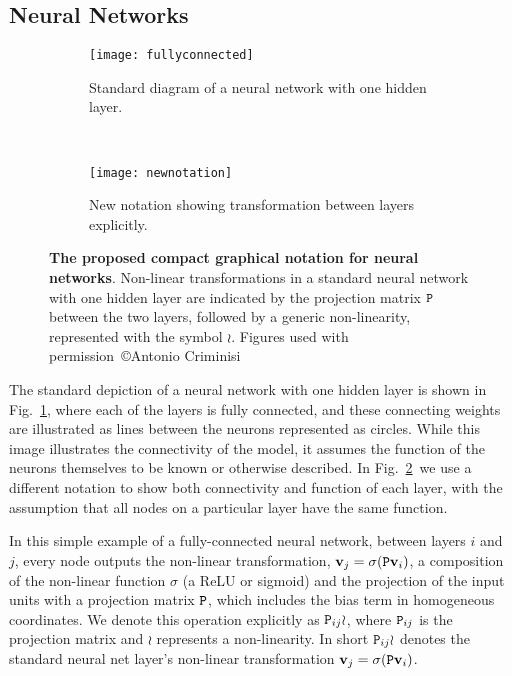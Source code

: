 \documentclass[thesis]{subfiles}
\begin{document}
\subsection{Neural Networks}
\begin{figure}[htbp!] 
\centering
\begin{subfigure}[b]{0.45\textwidth}
   \centering
   \texttt{[image: fullyconnected]}
   \caption{Standard diagram of a neural network with one hidden layer.}
   \label{fig:oldnotation}
\end{subfigure}
~
\begin{subfigure}[b]{0.45\textwidth}
   \centering
   \texttt{[image: newnotation]}
   \caption{New notation showing transformation between layers explicitly.}
   \label{fig:newnotation}
\end{subfigure}
\caption[New graphical notation for a standard neural network with one hidden layer.]{{\bf The proposed compact graphical notation for neural networks}. Non-linear transformations in a standard neural network with one hidden layer are indicated by the projection matrix $\mat P$ between the two layers, followed by a generic non-linearity, represented with the symbol $\wr$. Figures used with permission~\copyright Antonio Criminisi}
\label{fig:newGraphLanguage}
\end{figure}

The standard depiction of a neural network with one hidden layer is shown in Fig.~\ref{fig:oldnotation}, where each of the layers is fully connected, and these connecting weights are illustrated as lines between the neurons represented as circles. While this image illustrates the connectivity of the model, it assumes the function of the neurons themselves to be known or otherwise described. In Fig.~\ref{fig:newnotation}\ we use a different notation to show both connectivity and function of each layer, with the assumption that all nodes on a particular layer have the same function.

In this simple example of a fully-connected neural network, between layers $i$ and $j$, every node outputs the non-linear transformation, $\vec v_j = \sigma(\mat P \vec v_i)$, a composition of the non-linear function $\sigma$ (\eg a ReLU or sigmoid) and the projection of the input units with a projection matrix $\mat P$, which includes the bias term in homogeneous coordinates. We denote this operation explicitly as $\mat P_{ij} \wr$, where $\mat P_{ij}$ is the projection matrix and $\wr$ represents a non-linearity. In short $\mat P_{ij} \wr$ denotes the standard neural net layer's non-linear transformation $\vec v_j = \sigma(\mat P \vec v_i)$. 
\end{document}
